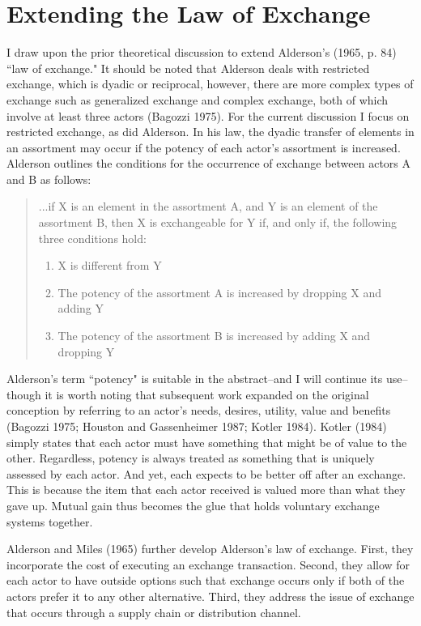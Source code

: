\section{Extending the Law of Exchange}
I draw upon the prior theoretical discussion to extend Alderson's (1965, p. 84) ``law of exchange." It should be noted that Alderson deals with restricted exchange, which is dyadic or reciprocal, however, there are more complex types of exchange such as generalized exchange and complex exchange, both of which involve at least three actors (Bagozzi 1975). For the current discussion I focus on restricted exchange, as did Alderson.  In his law, the dyadic transfer of elements in an assortment may occur if the potency of each actor's assortment is increased. Alderson outlines the conditions for the occurrence of exchange between actors A and B as follows:

\begin{footnotesize}
\begin{quote}
...if X is an element in the assortment A, and Y is an element of the assortment B, then X is exchangeable for Y if, and only if, the following three conditions hold:
\begin{enumerate}
  \item X is different from Y
  \item The potency of the assortment A is increased by dropping X and adding Y
  \item The potency of the assortment B is increased by adding X and dropping Y
\end{enumerate}
\end{quote}
\end{footnotesize}

Alderson's term ``potency" is suitable in the abstract--and I will continue its use--though it is worth noting that subsequent work expanded on the original conception by referring to an actor's needs, desires, utility, value and benefits (Bagozzi 1975; Houston and Gassenheimer 1987; Kotler 1984). Kotler (1984) simply states that each actor must have something that might be of value to the other. Regardless, potency is always treated as something that is uniquely assessed by each actor. And yet, each expects to be better off after an exchange. This is because the item that each actor received is valued more than what they gave up. Mutual gain thus becomes the glue that holds voluntary exchange systems together. 

Alderson and Miles (1965) further develop Alderson's law of exchange. First, they incorporate the cost of executing an exchange transaction. Second, they allow for each actor to have outside options such that exchange occurs only if both of the actors prefer it to any other alternative. Third, they address the issue of exchange that occurs through a supply chain or distribution channel. 

